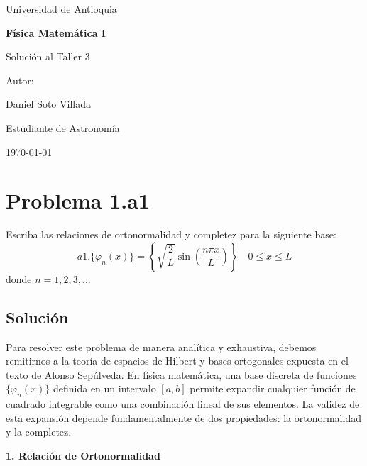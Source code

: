 \documentclass[a4paper]{article}
\begin{document}
\begin{titlepage}
  \centering
  {\Large Universidad de Antioquia\par}
  \vspace{2cm}
  {\huge\bfseries Física Matemática I\par}
  \vspace{0.4cm}
  {\Large Solución al Taller 3 \par}
  \vspace{2.5cm}
  {\large Autor:\par}
  \vspace{0.2cm}
  {\large Daniel Soto Villada\par}
  {\large Estudiante de Astronomía\par}
  \vfill
  {\large \today\par}
\end{titlepage}

\newpage
\tableofcontents
\newpage

\section{Problema 1.a1}
Escriba las relaciones de ortonormalidad y completez para la siguiente base:
$$ a1. \{\varphi_n(x)\} = \left\{\sqrt{\frac{2}{L}} \sin\left(\frac{n\pi x}{L}\right)\right\} \quad 0 \leq x \leq L $$
donde $n = 1, 2, 3, ...$

\subsection{Solución}

Para resolver este problema de manera analítica y exhaustiva, debemos remitirnos a la teoría de espacios de Hilbert y bases ortogonales expuesta en el texto de Alonso Sepúlveda. En física matemática, una base discreta de funciones $\{\varphi_n(x)\}$ definida en un intervalo $[a, b]$ permite expandir cualquier función de cuadrado integrable como una combinación lineal de sus elementos. La validez de esta expansión depende fundamentalmente de dos propiedades: la ortonormalidad y la completez.

\textbf{1. Relación de Ortonormalidad}
\end{document}
